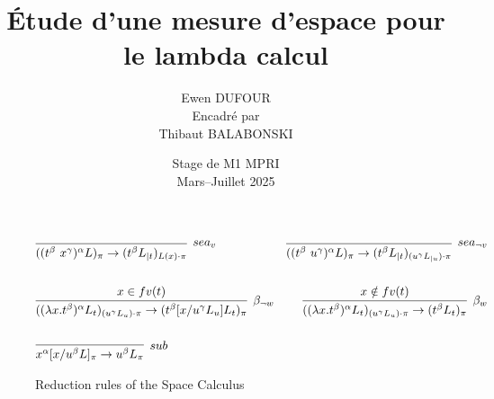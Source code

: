 \documentclass[11pt,a4paper]{article}
\title{Étude d'une mesure d'espace pour le lambda calcul}
\author{Ewen DUFOUR\\[1ex]
{\small Encadré par}\\ {\small Thibaut BALABONSKI}}
\date{Stage de M1 MPRI\\Mars--Juillet 2025}
\theoremstyle{definition}
\begin{document}
\begin{figure}[!h]
    \centering
    \begin{align*}
    &\infer[sea_v]{((t^\beta~x^\gamma)^\alpha L)_\pi \rightarrow (t^\beta L_{|t})_{L(x) \cdot \pi}}{}
 &\infer[sea_{\neg v}]{((t^\beta~u^\gamma)^\alpha L)_\pi \rightarrow (t^\beta L_{|t})_{(u^\gamma L_{|u}) \cdot \pi}}{}\\\\
&\infer[\beta_{\neg w}]{((\lambda x .t^\beta)^\alpha L_t)_{(u^\gamma L_u )\cdot \pi} \rightarrow (t^\beta[x/u^\gamma L_u]L_t)_\pi}{x \in fv(t) }
&\infer[\beta_w]{((\lambda x .t^\beta)^\alpha L_t)_{(u^\gamma L_u )\cdot \pi} \rightarrow (t^\beta L_t)_\pi}{x \notin fv(t) }\\\\
&\infer[sub]{x^\alpha[x/u^\beta L]_\pi \rightarrow u^\beta L_{\pi}}{}
\end{align*}
    \caption{Reduction rules of the Space Calculus}
    \label{fig:enter-label}
\end{figure}
\end{document}
